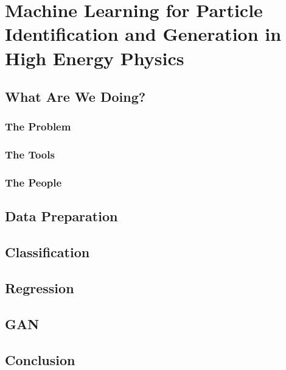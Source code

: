 \chapter{Machine Learning for Particle Identification and Generation in High Energy Physics}

\section{What Are We Doing?}

\subsection{The Problem}

\subsection{The Tools}

\subsection{The People}

\section{Data Preparation}

\section{Classification}

\section{Regression}

\section{GAN}

\section{Conclusion}